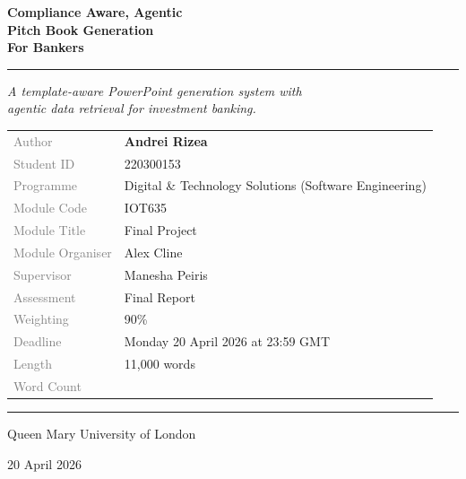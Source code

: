 \begin{titlepage}
\thispagestyle{empty}

\vspace*{1.2cm}

\begin{flushleft}
{\fontsize{28}{34}\selectfont\bfseries Compliance Aware, Agentic\\Pitch Book Generation\\For Bankers\par}

\vspace{0.5cm}

\textcolor{gray!70}{\rule{0.5\textwidth}{1pt}}

\vspace{0.5cm}

{\large\itshape A template-aware PowerPoint generation system with\\agentic data retrieval for investment banking.\par}
\end{flushleft}

\vspace{1.2cm}

\begin{flushleft}
\renewcommand{\arraystretch}{1.25}
\begin{tabular}{@{}l l}
\textcolor{gray}{Author} & \textbf{Andrei Rizea} \\
\textcolor{gray}{Student ID} & 220300153 \\
\textcolor{gray}{Programme} & Digital \& Technology Solutions (Software Engineering) \\
\textcolor{gray}{Module Code} & IOT635 \\
\textcolor{gray}{Module Title} & Final Project \\
\textcolor{gray}{Module Organiser} & Alex Cline \\
\textcolor{gray}{Supervisor} & Manesha Peiris \\
\textcolor{gray}{Assessment} & Final Report \\
\textcolor{gray}{Weighting} & 90\% \\
\textcolor{gray}{Deadline} & Monday 20 April 2026 at 23:59 GMT \\
\textcolor{gray}{Length} & 11,000 words \\
\textcolor{gray}{Word Count} &  \\
\end{tabular}
\end{flushleft}

\vfill

\begin{flushleft}
\textcolor{gray!70}{\rule{0.35\textwidth}{0.5pt}}

\vspace{0.3cm}

{\large Queen Mary University of London\par}
\vspace{0.15cm}
{20 April 2026\par}
\end{flushleft}

\vspace{0.5cm}

\end{titlepage}
